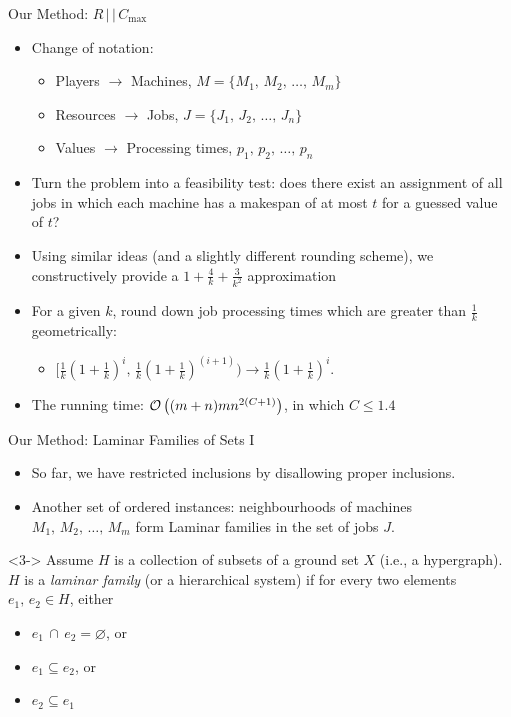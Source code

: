 \documentclass[10pt]{beamer}
\begin{document}
\begin{frame}{Our Method: $R \, | \, | \, C_{\max}$}
    \begin{itemize}
        \item<1-> Change of notation:
            \begin{itemize}
                \item<2-> Players $\rightarrow$ Machines, $M = \{M_1, \, M_2, \, \ldots, \, M_m\}$
                \item<3-> Resources $\rightarrow$ Jobs, $J = \{J_1, \, J_2, \, \ldots, \, J_n\}$
                \item<4-> Values $\rightarrow$ Processing times, $p_1, \, p_2, \, \ldots, \, p_n$
            \end{itemize}
        \item<5-> Turn the problem into a feasibility test: does there exist an assignment of \alert{all} jobs in which each machine has a makespan of at most $t$ for a \alert{guessed} value of $t$?
        \item<6-> Using similar ideas (and a slightly different rounding scheme), we constructively provide a $1 + \frac{4}{k} + \frac{3}{k^2}$ approximation
    	\item<7-> For a given $k$, round \alert{down} job processing times which are greater than $\frac{1}{k}$ geometrically:
    	\begin{itemize}
    	    \item<8-> $\Big[ \frac{1}{k}(1 + \frac{1}{k})^i, \, \frac{1}{k}(1 + \frac{1}{k})^{(i + 1)} \Big)  \rightarrow \frac{1}{k}(1 + \frac{1}{k})^i$.
    	\end{itemize} 
    	\item<9-> The running time: $\mathcal{O} \left( (m + n)mn^{2(C + 1)} \right)$, in which $C \leq 1.4$
    \end{itemize}
\end{frame}

\begin{frame}{Our Method: Laminar Families of Sets I}
	\begin{itemize}
		\item<1-> So far, we have restricted inclusions by disallowing proper inclusions. 
        \item<2-> Another set of ordered instances: neighbourhoods of machines $M_1, \, M_2, \, \ldots, \, M_m$ form \alert{Laminar} families in the set of jobs $J$.
	\end{itemize}
    \begin{definition}<3->
    	Assume $H$ is a collection of subsets of a ground set $X$ (i.e., a \alert{hypergraph}). $H$ is a \emph{laminar family} (or a \alert{hierarchical system}) if for every two elements $e_1, \, e_2 \in H$, either
        \begin{itemize}
        	\item $e_1 \, \cap \, e_2 = \varnothing$, or
            \item $e_1 \subseteq e_2$, or
            \item $e_2 \subseteq e_1$
        \end{itemize}
    \end{definition}
\end{frame}
\end{document}
